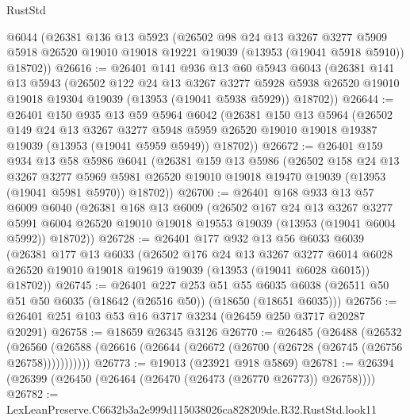 \begin{lexlean}{RustStd}
\begin{coremodule}
    @6044
    (@26381
      @136
      @13
      @5923
      (@26502
        @98
        @24
        @13
        @3267
        @3277
        @5909
        @5918
        @26520
        @19010
        @19018
        @19221
        @19039
        (@13953 (@19041 @5918 @5910))
        @18702))
@26616 := @26401
    @141
    @936
    @13
    @60
    @5943
    @6043
    (@26381
      @141
      @13
      @5943
      (@26502
        @122
        @24
        @13
        @3267
        @3277
        @5928
        @5938
        @26520
        @19010
        @19018
        @19304
        @19039
        (@13953 (@19041 @5938 @5929))
        @18702))
@26644 := @26401
    @150
    @935
    @13
    @59
    @5964
    @6042
    (@26381
      @150
      @13
      @5964
      (@26502
        @149
        @24
        @13
        @3267
        @3277
        @5948
        @5959
        @26520
        @19010
        @19018
        @19387
        @19039
        (@13953 (@19041 @5959 @5949))
        @18702))
@26672 := @26401
    @159
    @934
    @13
    @58
    @5986
    @6041
    (@26381
      @159
      @13
      @5986
      (@26502
        @158
        @24
        @13
        @3267
        @3277
        @5969
        @5981
        @26520
        @19010
        @19018
        @19470
        @19039
        (@13953 (@19041 @5981 @5970))
        @18702))
@26700 := @26401
    @168
    @933
    @13
    @57
    @6009
    @6040
    (@26381
      @168
      @13
      @6009
      (@26502
        @167
        @24
        @13
        @3267
        @3277
        @5991
        @6004
        @26520
        @19010
        @19018
        @19553
        @19039
        (@13953 (@19041 @6004 @5992))
        @18702))
@26728 := @26401
    @177
    @932
    @13
    @56
    @6033
    @6039
    (@26381
      @177
      @13
      @6033
      (@26502
        @176
        @24
        @13
        @3267
        @3277
        @6014
        @6028
        @26520
        @19010
        @19018
        @19619
        @19039
        (@13953 (@19041 @6028 @6015))
        @18702))
@26745 := @26401
    @227
    @253
    @51
    @55
    @6035
    @6038
    (@26511 @50 @51 @50 @6035 (@18642 (@26516 @50)) (@18650 (@18651 @6035)))
@26756 := @26401 @251 @103 @53 @16 @3717 @3234 (@26459 @250 @3717 @20287 @20291)
@26758 := @18659 @26345 @3126
@26770 := @26485
    (@26488
      (@26532
        (@26560 (@26588 (@26616 (@26644 (@26672 (@26700 (@26728 (@26745 (@26756 @26758)))))))))))
@26773 := @19013 (@23921 @918 @5869)
@26781 := @26394 (@26399 (@26450 (@26464 (@26470 (@26473 (@26770 @26773)) @26758))))
@26782 := LexLeanPreserve.C6632b3a2e999d115038026ca828209de.R32.RustStd.look11

\end{coremodule}
\end{lexlean}
